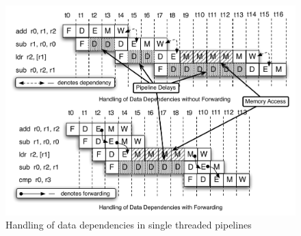 \begin{figure}
\begin{center}
\includegraphics[scale=.6]{figs/data_depend_execution_non_interleaved}
\end{center}
\vspace{-10pt}
\caption{Handling of data dependencies in single threaded pipelines}
\label{data_depend_execution_non_interleaved}
\end{figure}


